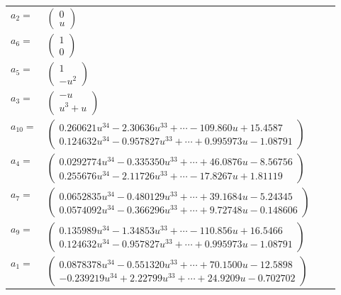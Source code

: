 \documentclass[1p]{elsarticle_modified}
\theoremstyle{definition}
\begin{document}
\begin{tabular}{m{7pt} m{180pt} m{7pt} m{180pt} }
\flushright $a_{2}=$&$\begin{pmatrix}0\\u\end{pmatrix}$ \\
\flushright $a_{6}=$&$\begin{pmatrix}1\\0\end{pmatrix}$ \\
\flushright $a_{5}=$&$\begin{pmatrix}1\\- u^2\end{pmatrix}$ \\
\flushright $a_{3}=$&$\begin{pmatrix}- u\\u^3+u\end{pmatrix}$ \\
\flushright $a_{10}=$&$\begin{pmatrix}0.260621 u^{34}-2.30636 u^{33}+\cdots-109.860 u+15.4587\\0.124632 u^{34}-0.957827 u^{33}+\cdots+0.995973 u-1.08791\end{pmatrix}$ \\
\flushright $a_{4}=$&$\begin{pmatrix}0.0292774 u^{34}-0.335350 u^{33}+\cdots+46.0876 u-8.56756\\0.255676 u^{34}-2.11726 u^{33}+\cdots-17.8267 u+1.81119\end{pmatrix}$ \\
\flushright $a_{7}=$&$\begin{pmatrix}0.0652835 u^{34}-0.480129 u^{33}+\cdots+39.1684 u-5.24345\\0.0574092 u^{34}-0.366296 u^{33}+\cdots+9.72748 u-0.148606\end{pmatrix}$ \\
\flushright $a_{9}=$&$\begin{pmatrix}0.135989 u^{34}-1.34853 u^{33}+\cdots-110.856 u+16.5466\\0.124632 u^{34}-0.957827 u^{33}+\cdots+0.995973 u-1.08791\end{pmatrix}$ \\
\flushright $a_{1}=$&$\begin{pmatrix}0.0878378 u^{34}-0.551320 u^{33}+\cdots+70.1500 u-12.5898\\-0.239219 u^{34}+2.22799 u^{33}+\cdots+24.9209 u-0.702702\end{pmatrix}$ \\

\end{tabular}
\end{document}
